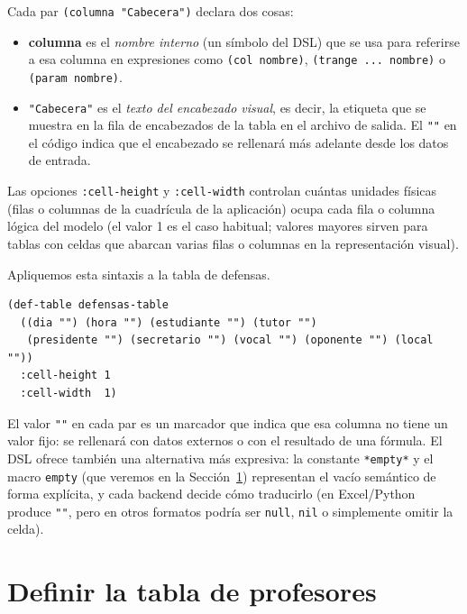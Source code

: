 \documentclass[12pt,a4paper]{report}
\begin{document}
Cada par {\texttt{(columna "Cabecera")}} declara dos cosas:
\begin{itemize}
  \item \textbf{columna} es el \emph{nombre interno} (un símbolo del DSL)
    que se usa para referirse a esa columna en expresiones como
    \texttt{(col nombre)}, \texttt{(trange ... nombre)} o
    \texttt{(param nombre)}.
  \item {\texttt{"Cabecera"}} es el \emph{texto del encabezado visual}, es
    decir, la etiqueta que se muestra en la fila de encabezados de la tabla
    en el archivo de salida.  El {\texttt{""}} en el código indica que el
    encabezado se rellenará más adelante desde los datos de entrada.
\end{itemize}
Las opciones \texttt{:cell-height} y \texttt{:cell-width} controlan cuántas
unidades físicas (filas o columnas de la cuadrícula de la aplicación) ocupa
cada fila o columna lógica del modelo (el valor 1 es el caso habitual;
valores mayores sirven para tablas con celdas que abarcan varias filas o
columnas en la representación visual).

Apliquemos esta sintaxis a la tabla de defensas.

\begin{lstlisting}[caption={Definicion de defensas-table.}]
(def-table defensas-table
  ((dia "") (hora "") (estudiante "") (tutor "")
   (presidente "") (secretario "") (vocal "") (oponente "") (local ""))
  :cell-height 1
  :cell-width  1)
\end{lstlisting}

El valor \texttt{""} en cada par es un marcador que indica que esa columna
no tiene un valor fijo: se rellenará con datos externos o con el resultado
de una fórmula.  El DSL ofrece también una alternativa más expresiva:
la constante \texttt{*empty*} y el macro \texttt{empty} (que veremos en la
Sección~\ref{sec:profesores-table}) representan el vacío semántico de
forma explícita, y cada backend decide cómo traducirlo (en Excel/Python
produce \texttt{""}, pero en otros formatos podría ser \texttt{null},
\texttt{nil} o simplemente omitir la celda).

\section{Definir la tabla de profesores}
\label{sec:profesores-table}
\end{document}
